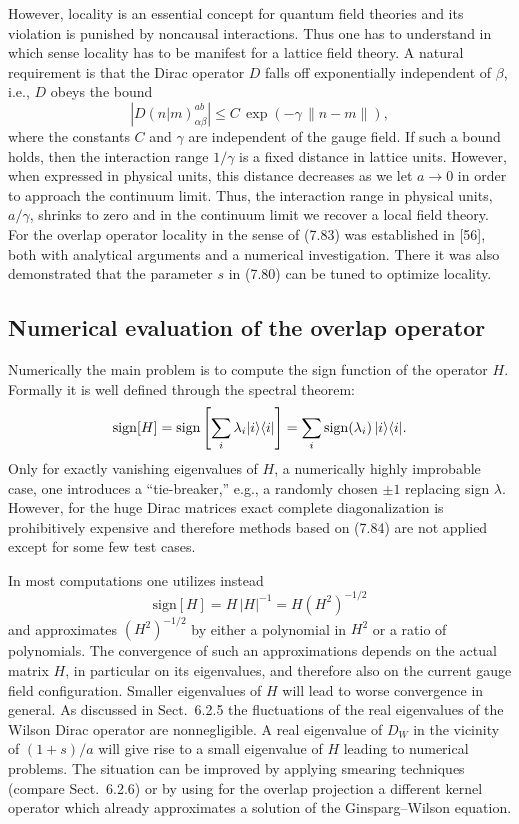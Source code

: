 However, locality is an essential concept for quantum field theories and its
violation is punished by noncausal interactions. Thus one has to understand in
which sense locality has to be manifest for a lattice field theory. A natural
requirement is that the Dirac operator $D$ falls off exponentially independent
of $\beta$, i.e., $D$ obeys the bound
\begin{equation}
  \left|D(n|m)^{ab}_{\alpha\beta}\right| \leq C\,\exp\left(-\gamma\,\|n-m\|\right),
\end{equation}
where the constants $C$ and $\gamma$ are independent of the gauge field. If
such a bound holds, then the interaction range $1/\gamma$ is a fixed distance
in lattice units. However, when expressed in physical units, this distance
decreases as we let $a \to 0$ in order to approach the continuum limit. Thus,
the interaction range in physical units, $a/\gamma$, shrinks to zero and in
the continuum limit we recover a local field theory. For the overlap operator
locality in the sense of (7.83) was established in [56], both with analytical
arguments and a numerical investigation. There it was also demonstrated that
the parameter $s$ in (7.80) can be tuned to optimize locality.

\subsection{Numerical evaluation of the overlap operator}

Numerically the main problem is to compute the sign function of the operator
$H$. Formally it is well defined through the spectral theorem:
\begin{equation}
  \mathrm{sign}[H] = \mathrm{sign}\left[\sum_i \lambda_i |i\rangle\langle i|\right]
  = \sum_i \mathrm{sign}(\lambda_i)\,|i\rangle\langle i| .
\end{equation}
Only for exactly vanishing eigenvalues of $H$, a numerically highly improbable
case, one introduces a ``tie-breaker,'' e.g., a randomly chosen $\pm 1$
replacing sign $\lambda$. However, for the huge Dirac matrices exact complete
diagonalization is prohibitively expensive and therefore methods based on
(7.84) are not applied except for some few test cases.

In most computations one utilizes instead
\begin{equation}
  \mathrm{sign}[H] = H\,|H|^{-1} = H\left(H^2\right)^{-1/2}
\end{equation}
and approximates $(H^2)^{-1/2}$ by either a polynomial in $H^2$ or a ratio of
polynomials. The convergence of such an approximations depends on the actual
matrix $H$, in particular on its eigenvalues, and therefore also on the current
gauge field configuration. Smaller eigenvalues of $H$ will lead to worse
convergence in general. As discussed in Sect.~6.2.5 the fluctuations of the
real eigenvalues of the Wilson Dirac operator are nonnegligible. A real
eigenvalue of $D_W$ in the vicinity of $(1+s)/a$ will give rise to a small
eigenvalue of $H$ leading to numerical problems. The situation can be improved
by applying smearing techniques (compare Sect.~6.2.6) or by using for the
overlap projection a different kernel operator which already approximates a
solution of the Ginsparg--Wilson equation.

